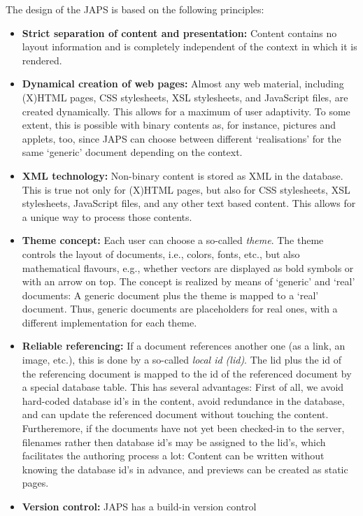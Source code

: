 \documentclass[a4paper,11pt]{article}
\newcommand{\minorheadline}[1]{\textbf{#1:}}
\begin{document}
The design of the JAPS is based on the following principles:
\begin{itemize}
\item \minorheadline{Strict separation of content and presentation}
  Content contains no layout information and is completely independent of the context in
  which it is rendered.
\item \minorheadline{Dynamical creation of web pages}
  Almost any web material, including (X)HTML pages, CSS stylesheets, XSL stylesheets, and
  Java\-Script files, are created dynamically. This allows for a maximum of user
  adaptivity. To some extent, this is possible with binary contents as, for instance,
  pictures and applets, too, since JAPS can choose between different `realisations' for the
  same `generic' document depending on the context.
\item \minorheadline{XML technology}
  Non-binary content is stored as XML in the database. This is true not only for
  (X)HTML pages, but also for CSS stylesheets, XSL stylesheets, Java\-Script files, and any
  other text based content. This allows for a unique way to process those contents.
\item \minorheadline{Theme concept}
  Each user can choose a so-called \emph{theme}. The theme controls the layout of documents,
  i.e., colors, fonts, etc., but also mathematical flavours, e.g., whether vectors are
  displayed as bold symbols or with an arrow on top. The concept is realized by means of
  `generic' and `real' documents: A generic document plus the theme is mapped to a `real'
  document. Thus, generic documents are placeholders for real ones, with a different
  implementation for each theme.
\item \minorheadline{Reliable referencing}
  If a document references another one (as a link, an image, etc.), this is done by a so-called
  \emph{local id (lid)}. The lid plus the id of the referencing document is mapped to
  the id of the referenced document by a special database table. This has several
  advantages: First of all, we avoid hard-coded database id's in the content, avoid
  redundance in the database, and can update the referenced document without touching the
  content. Furtheremore, if the documents have not yet been checked-in to the server,
  filenames rather then database id's may be assigned to the lid's, which facilitates
  the authoring process a lot: Content can be written without knowing the database id's in
  advance, and previews can be created as static pages.
\item \minorheadline{Version control} JAPS has a build-in version control

\end{itemize}
\end{document}
